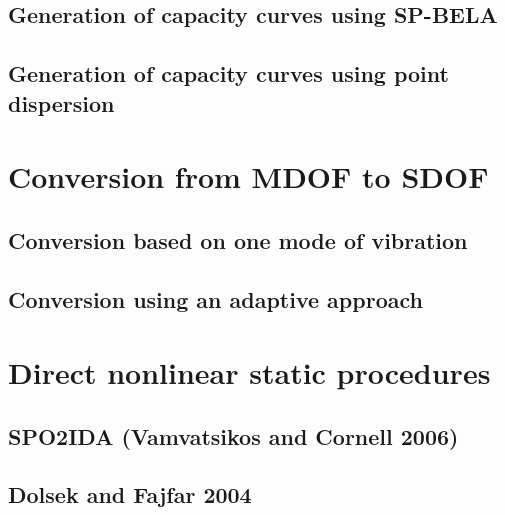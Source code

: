 		\subsection{Generation of capacity curves using SP-BELA}
		\label{subsec:SPBELA}
		

		\subsection{Generation of capacity curves using point dispersion}
		\label{subsec:dispersion}
		

	\section{Conversion from MDOF to SDOF}
	\label{sec:mdof_to_sdof}
	

		\subsection{Conversion based on one mode of vibration}
		\label{subsec:one_mode}
		

		\subsection{Conversion using an adaptive approach}
		\label{subsec:adaptive}
		

	\section{Direct nonlinear static procedures}
	\label{subsec:direct-nsp}
	

		\subsection{SPO2IDA (Vamvatsikos and Cornell 2006)}
		\label{subsec:SPO2IDA}
		

		\subsection{Dolsek and Fajfar 2004}
		\label{subsec:DolsekFajfar}
		

